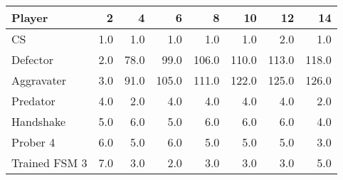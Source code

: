 \begin{tabular}{lrrrrrrr}
\toprule
        Player &    2 &     4 &      6 &      8 &     10 &     12 &     14 \\
\midrule
            CS &  1.0 &   1.0 &    1.0 &    1.0 &    1.0 &    2.0 &    1.0 \\
      Defector &  2.0 &  78.0 &   99.0 &  106.0 &  110.0 &  113.0 &  118.0 \\
    Aggravater &  3.0 &  91.0 &  105.0 &  111.0 &  122.0 &  125.0 &  126.0 \\
      Predator &  4.0 &   2.0 &    4.0 &    4.0 &    4.0 &    4.0 &    2.0 \\
     Handshake &  5.0 &   6.0 &    5.0 &    6.0 &    6.0 &    6.0 &    4.0 \\
      Prober 4 &  6.0 &   5.0 &    6.0 &    5.0 &    5.0 &    5.0 &    3.0 \\
 Trained FSM 3 &  7.0 &   3.0 &    2.0 &    3.0 &    3.0 &    3.0 &    5.0 \\
\bottomrule
\end{tabular}
